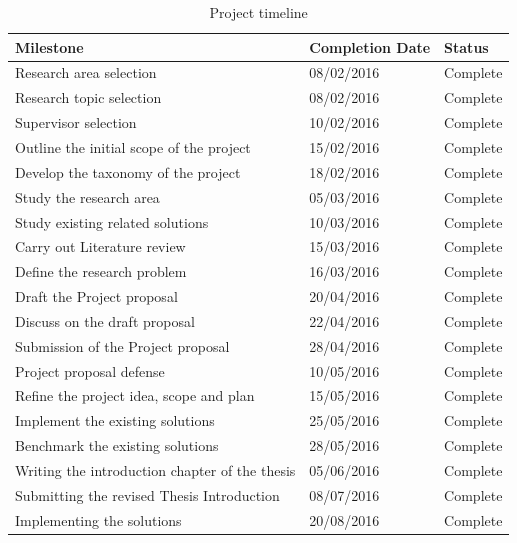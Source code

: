 \documentclass[12pt]{article}
\begin{document}
\clearpage
\begin{table}[]
\centering
\caption{Project timeline}
\label{project-timeline}
\begin{tabular}{|l|l|l|}
\hline
Milestone                                      & Completion Date & Status   \\ \hline
Research area selection                        & 08/02/2016      & Complete \\ \hline
Research topic selection                       & 08/02/2016      & Complete \\ \hline
Supervisor selection                           & 10/02/2016      & Complete \\ \hline
Outline the initial scope of the project       & 15/02/2016      & Complete \\ \hline
Develop the taxonomy of the project            & 18/02/2016      & Complete \\ \hline
Study the research area                        & 05/03/2016      & Complete \\ \hline
Study existing related solutions               & 10/03/2016      & Complete \\ \hline
Carry out Literature review                    & 15/03/2016      & Complete \\ \hline
Define the research problem                    & 16/03/2016      & Complete \\ \hline
Draft the Project proposal                     & 20/04/2016      & Complete \\ \hline
Discuss on the draft proposal                  & 22/04/2016      & Complete \\ \hline
Submission of the Project proposal             & 28/04/2016      & Complete \\ \hline
Project proposal defense                       & 10/05/2016      & Complete \\ \hline
Refine the project idea, scope and plan        & 15/05/2016      & Complete \\ \hline
Implement the existing solutions               & 25/05/2016      & Complete \\ \hline
Benchmark the existing solutions               & 28/05/2016      & Complete \\ \hline
Writing the introduction chapter of the thesis & 05/06/2016      & Complete \\ \hline
Submitting the revised Thesis Introduction     & 08/07/2016      & Complete \\ \hline
Implementing the solutions                     & 20/08/2016      & Complete \\ \hline

\end{tabular}
\end{table}
\end{document}
